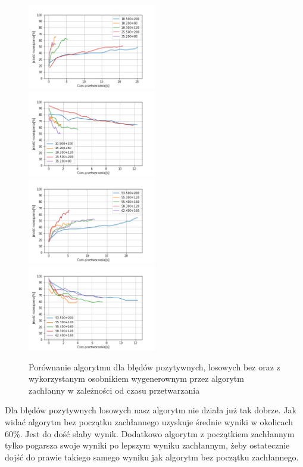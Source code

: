 \documentclass{article}
\begin{document}
\begin{figure}[H]
\includegraphics[width=0.5\textwidth]{Czaspoz-los1.png}
\includegraphics[width=0.5\textwidth]{Czaspoz-los-greedy1.png}
\includegraphics[width=0.5\textwidth]{Czaspoz-los2.png}
\includegraphics[width=0.5\textwidth]{Czaspoz-los-greedy2.png}
\caption{Porównanie algorytmu dla błędów pozytywnych, losowych bez oraz z wykorzystanym osobnikiem wygenerownym przez algorytm zachłanny w zależności od czasu przetwarzania}
\end{figure}
Dla błędów pozytywnych losowych nasz algorytm nie działa już tak dobrze. Jak widać algorytm bez początku zachłannego uzyskuje średnie wyniki w okolicach 60\%. Jest do dość słaby wynik. Dodatkowo algorytm z początkiem zachłannym tylko pogarsza swoje wyniki po lepszym wyniku zachłannym, żeby ostatecznie dojść do prawie takiego samego wyniku jak algorytm bez początku zachłannego.  
\end{document}
